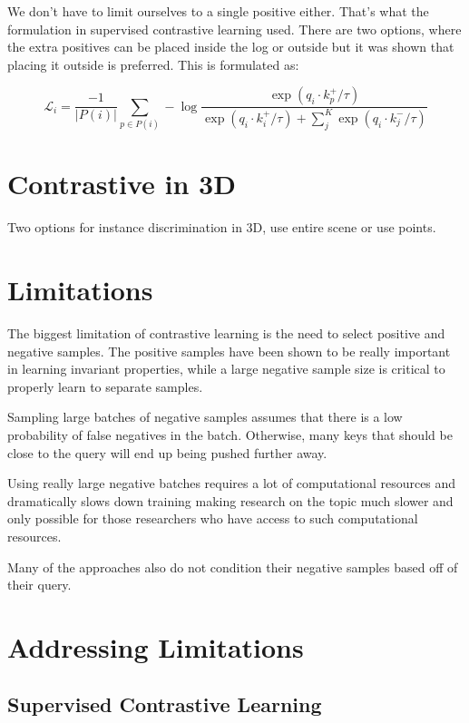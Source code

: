 \documentclass[12pt]{article}
\begin{document}
We don't have to limit ourselves to a single positive either. That's what the formulation in supervised contrastive learning \cite{khosla_supervised_2021} used. There are two options, where the extra positives can be placed inside the log or outside but it was shown that placing it outside is preferred. This is formulated as:

$$\mathcal{L}_{i} = \frac{-1}{|P(i)|} \sum_{p \in P(i)} -\log \frac{\exp(q_{i} \cdot k^{+}_{p} / \tau)}{\exp(q_{i} \cdot k^{+}_{i} / \tau) + \sum^{K}_{j}\exp(q_{i} \cdot k^{-}_{j} / \tau)}$$


\section{Contrastive in 3D}

Two options for instance discrimination in 3D, use entire scene or use points.

\section{Limitations}

The biggest limitation of contrastive learning is the need to select positive and negative samples. The positive samples have been shown to be really important in learning invariant properties, while a large negative sample size is critical to properly learn to separate samples.
%

Sampling large batches of negative samples assumes that there is a low probability of false negatives in the batch. Otherwise, many keys that should be close to the query will end up being pushed further away.

Using really large negative batches requires a lot of computational resources and dramatically slows down training making research on the topic much slower and only possible for those researchers who have access to such computational resources.
%

Many of the approaches also do not condition their negative samples based off of their query.

\section{Addressing Limitations}
\label{limitations}

\subsection{Supervised Contrastive Learning}
\label{limitations:supervised}
\end{document}
